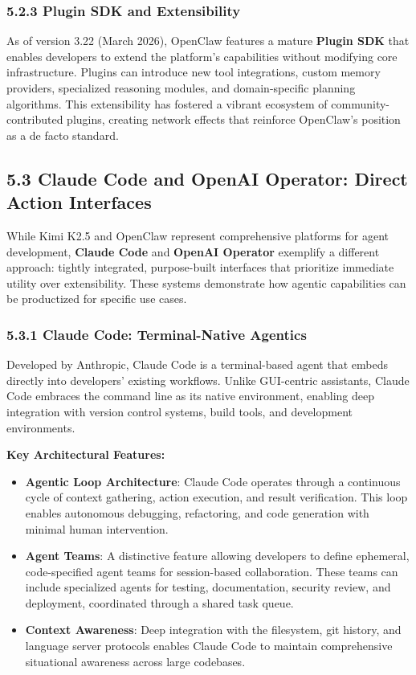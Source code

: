 \subsubsection{5.2.3 Plugin SDK and Extensibility}

As of version 3.22 (March 2026), OpenClaw features a mature \textbf{Plugin SDK} that enables developers to extend the platform's capabilities without modifying core infrastructure. Plugins can introduce new tool integrations, custom memory providers, specialized reasoning modules, and domain-specific planning algorithms. This extensibility has fostered a vibrant ecosystem of community-contributed plugins, creating network effects that reinforce OpenClaw's position as a de facto standard.

\subsection{5.3 Claude Code and OpenAI Operator: Direct Action Interfaces}

While Kimi K2.5 and OpenClaw represent comprehensive platforms for agent development, \textbf{Claude Code} and \textbf{OpenAI Operator} exemplify a different approach: tightly integrated, purpose-built interfaces that prioritize immediate utility over extensibility. These systems demonstrate how agentic capabilities can be productized for specific use cases.

\subsubsection{5.3.1 Claude Code: Terminal-Native Agentics}

Developed by Anthropic, Claude Code is a terminal-based agent that embeds directly into developers' existing workflows. Unlike GUI-centric assistants, Claude Code embraces the command line as its native environment, enabling deep integration with version control systems, build tools, and development environments.

\textbf{Key Architectural Features:}

\begin{itemize}
    \item \textbf{Agentic Loop Architecture}: Claude Code operates through a continuous cycle of context gathering, action execution, and result verification. This loop enables autonomous debugging, refactoring, and code generation with minimal human intervention.

    \item \textbf{Agent Teams}: A distinctive feature allowing developers to define ephemeral, code-specified agent teams for session-based collaboration. These teams can include specialized agents for testing, documentation, security review, and deployment, coordinated through a shared task queue.

    \item \textbf{Context Awareness}: Deep integration with the filesystem, git history, and language server protocols enables Claude Code to maintain comprehensive situational awareness across large codebases.

\end{itemize}
